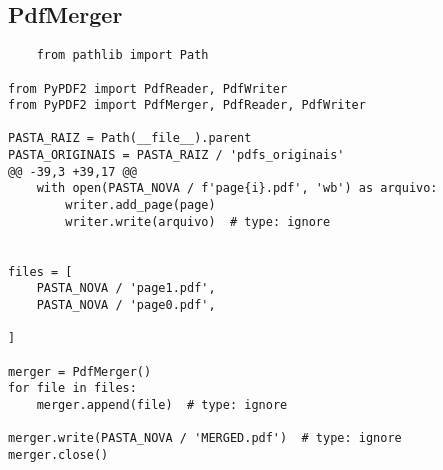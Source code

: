 \documentclass{article}
\begin{document}
\subsection{PdfMerger}
\begin{lstlisting}
    from pathlib import Path

from PyPDF2 import PdfReader, PdfWriter
from PyPDF2 import PdfMerger, PdfReader, PdfWriter

PASTA_RAIZ = Path(__file__).parent
PASTA_ORIGINAIS = PASTA_RAIZ / 'pdfs_originais'
@@ -39,3 +39,17 @@
    with open(PASTA_NOVA / f'page{i}.pdf', 'wb') as arquivo:
        writer.add_page(page)
        writer.write(arquivo)  # type: ignore


files = [
    PASTA_NOVA / 'page1.pdf',
    PASTA_NOVA / 'page0.pdf',

]

merger = PdfMerger()
for file in files:
    merger.append(file)  # type: ignore

merger.write(PASTA_NOVA / 'MERGED.pdf')  # type: ignore
merger.close()

\end{lstlisting}
\end{document}
